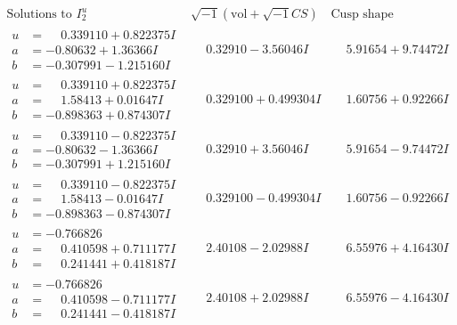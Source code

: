 \documentclass[1p]{elsarticle_modified}
\theoremstyle{definition}
\newcommand{\I}{\sqrt{-1}}
\begin{document}
$$\begin{array}{c|c|c}  
\text{Solutions to }I^u_{2}& \I (\text{vol} + \sqrt{-1}CS) & \text{Cusp shape}\\
 \hline 
\begin{aligned}
u &= \phantom{-}0.339110 + 0.822375 I \\
a &= -0.80632 + 1.36366 I \\
b &= -0.307991 - 1.215160 I\end{aligned}
 & \phantom{-}0.32910 - 3.56046 I & \phantom{-}5.91654 + 9.74472 I \\ \hline\begin{aligned}
u &= \phantom{-}0.339110 + 0.822375 I \\
a &= \phantom{-}1.58413 + 0.01647 I \\
b &= -0.898363 + 0.874307 I\end{aligned}
 & \phantom{-}0.329100 + 0.499304 I & \phantom{-}1.60756 + 0.92266 I \\ \hline\begin{aligned}
u &= \phantom{-}0.339110 - 0.822375 I \\
a &= -0.80632 - 1.36366 I \\
b &= -0.307991 + 1.215160 I\end{aligned}
 & \phantom{-}0.32910 + 3.56046 I & \phantom{-}5.91654 - 9.74472 I \\ \hline\begin{aligned}
u &= \phantom{-}0.339110 - 0.822375 I \\
a &= \phantom{-}1.58413 - 0.01647 I \\
b &= -0.898363 - 0.874307 I\end{aligned}
 & \phantom{-}0.329100 - 0.499304 I & \phantom{-}1.60756 - 0.92266 I \\ \hline\begin{aligned}
u &= -0.766826\phantom{ +0.000000I} \\
a &= \phantom{-}0.410598 + 0.711177 I \\
b &= \phantom{-}0.241441 + 0.418187 I\end{aligned}
 & \phantom{-}2.40108 - 2.02988 I & \phantom{-}6.55976 + 4.16430 I \\ \hline\begin{aligned}
u &= -0.766826\phantom{ +0.000000I} \\
a &= \phantom{-}0.410598 - 0.711177 I \\
b &= \phantom{-}0.241441 - 0.418187 I\end{aligned}
 & \phantom{-}2.40108 + 2.02988 I & \phantom{-}6.55976 - 4.16430 I \\ \hline\begin{aligned}

\end{aligned}
\end{array}$$
\end{document}
